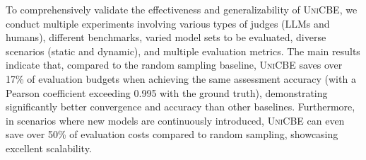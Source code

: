 To comprehensively validate the effectiveness and generalizability of \textsc{UniCBE}, we conduct multiple experiments involving various types of judges (LLMs and humans), different benchmarks, varied model sets to be evaluated, diverse scenarios (static and dynamic), and multiple evaluation metrics. 
The main results indicate that, compared to the random sampling baseline, \textsc{UniCBE} saves over 17\% of evaluation budgets when achieving the same assessment accuracy (with a Pearson coefficient exceeding 0.995 with the ground truth), demonstrating significantly better convergence and accuracy than other baselines. Furthermore, in scenarios where new models are continuously introduced, \textsc{UniCBE} can even save over 50\% of evaluation costs compared to random sampling, showcasing excellent scalability.




